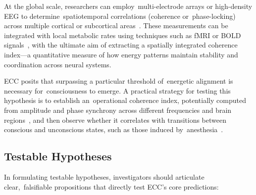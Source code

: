 At the global scale, researchers can employ~multi-electrode arrays or high-density EEG to determine~spatiotemporal correlations (coherence or~phase-locking) across multiple cortical or subcortical areas~\cite{Palva2018, van2025processes}. These measurements can be integrated with local metabolic rates using techniques such as fMRI or BOLD signals~\cite{Scholvinck2013, haier1988cortical}, with the ultimate aim of extracting a spatially integrated coherence index—a quantitative measure of how energy patterns maintain stability and coordination across neural systems.

ECC posits that surpassing a particular threshold of~energetic alignment is necessary for~consciousness to emerge. A practical strategy for testing this hypothesis is to establish an~operational coherence index, potentially computed from amplitude and phase synchrony across different frequencies and brain regions~\cite{Casali2013, Barrett2011}, and then observe whether it correlates with transitions between conscious and unconscious states, such as those induced by~anesthesia~\cite{Mashour2018}.

\subsection*{Testable Hypotheses}

In formulating testable hypotheses, investigators should articulate clear,~falsifiable propositions that directly test ECC's core predictions:

